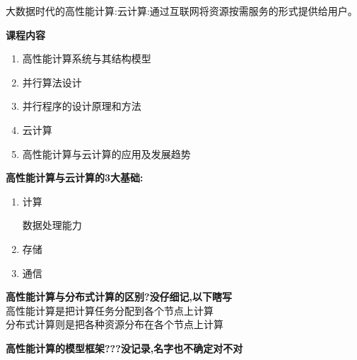 \documentclass[UTF8,a4paper]{ctexart}
\newcommand{\spaceline}{\vspace{\baselineskip}}
\begin{document}
  大数据时代的高性能计算:云计算:通过互联网将资源按需服务的形式提供给用户。

  \spaceline
  \textbf{课程内容}
  \begin{enumerate}
    \item 高性能计算系统与其结构模型
    \item 并行算法设计
    \item 并行程序的设计原理和方法
    \item 云计算
    \item 高性能计算与云计算的应用及发展趋势
  \end{enumerate}

  \spaceline
  \textbf{高性能计算与云计算的3大基础:}
  \begin{enumerate}
    \item 计算

    数据处理能力

    \item 存储

    \item 通信
  \end{enumerate}

  \spaceline
  \textbf{高性能计算与分布式计算的区别?没仔细记,以下瞎写}\\
  高性能计算是把计算任务分配到各个节点上计算\\
  分布式计算则是把各种资源分布在各个节点上计算

  \spaceline
  \textbf{高性能计算的模型框架???没记录,名字也不确定对不对}
\end{document}

